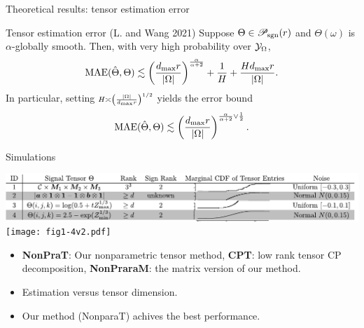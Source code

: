 \documentclass[10pt, mathserif]{beamer} %
\theoremstyle{definition}
\theoremstyle{plain}
\def\caliP{\mathscr{P}_{\textup{sgn}}}
\begin{document}
\begin{frame}{Theoretical results: tensor estimation error}
    \begin{block}{Tensor estimation error (L. and Wang 2021)}
    Suppose $\Theta\in\caliP(r)$ and  $\Theta(\omega)$ is $\alpha$-globally smooth. Then, with very high probability over $\mathcal{Y}_\Omega$, 
    \begin{equation}\label{eq:bound2}
\textup{MAE}(\hat \Theta, \Theta)\lesssim \left({d_{\max} r \over |\Omega|}\right)^{\alpha\over\alpha+2}+{1\over H}+{Hd_{\max} r \over |\Omega|}.
\end{equation}
In particular, setting $\scriptstyle H\asymp \left( |\Omega|\over d_{\max}r\right)^{1/2}$ yields the error bound
\begin{equation}\label{eq:real}
\textup{MAE}(\hat \Theta, \Theta)\lesssim \left(d_{\max}r \over |\Omega|\right)^{{\alpha \over \alpha+2} \vee {1\over 2}}.
\end{equation}
    \end{block}
\end{frame}


\begin{frame}{Simulations}
    \begin{center}
    \includegraphics[width = \textwidth]{simulation.pdf}
    \texttt{[image: fig1-4v2.pdf]}
    \end{center}
    \begin{itemize}
    \item {\bf NonPraT}: Our nonparametric tensor method, {\bf CPT}: low rank tensor CP decomposition, {\bf NonPraraM}: the matrix version of our method.
    \item Estimation versus tensor dimension.
    \item Our method (NonparaT) achives the best performance.
    \end{itemize}
\end{frame}
\end{document}
